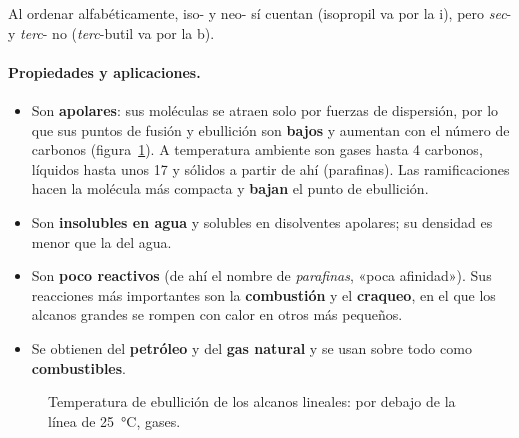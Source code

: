 Al ordenar alfabéticamente, iso- y neo- sí cuentan (isopropil va por la i), pero \emph{sec}- y \emph{terc}- no (\emph{terc}-butil va
por la b).

\paragraph{Propiedades y aplicaciones.}
\begin{itemize}
    \item Son \textbf{apolares}: sus moléculas se atraen solo por fuerzas de dispersión, por lo que sus puntos de fusión y
    ebullición son \textbf{bajos} y aumentan con el número de carbonos (figura~\ref{fig:ud7-ebullicion}). A temperatura ambiente
    son gases hasta 4 carbonos, líquidos hasta unos 17 y sólidos a partir de ahí (parafinas). Las ramificaciones hacen la molécula
    más compacta y \textbf{bajan} el punto de ebullición.
    \item Son \textbf{insolubles en agua} y solubles en disolventes apolares; su densidad es menor que la del agua.
    \item Son \textbf{poco reactivos} (de ahí el nombre de \emph{parafinas}, «poca afinidad»). Sus reacciones más importantes son la
    \textbf{combustión} y el \textbf{craqueo}, en el que los alcanos grandes se rompen con calor en otros más pequeños.
    \item Se obtienen del \textbf{petróleo} y del \textbf{gas natural} y se usan sobre todo como \textbf{combustibles}.
\end{itemize}

\begin{figure}[H]
    \centering
    \caption{Temperatura de ebullición de los alcanos lineales: por debajo de la línea de \qty{25}{\degreeCelsius}, gases.}
    \label{fig:ud7-ebullicion}
\end{figure}

